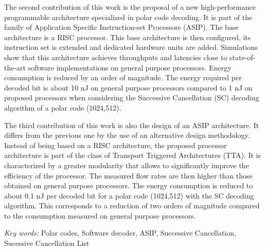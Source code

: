 The second contribution of this work is the proposal of a new high-performance programmable architecture specialized in polar code decoding. It is part of the family of Application Specific Instruction-set Processors (ASIP). The base architecture is a RISC processor. This base architecture is then configured, its instruction set is extended and dedicated hardware units are added. Simulations show that this architecture achieves throughputs and latencies close to state-of-the-art software implementations on general purpose processors. Energy consumption is reduced by an order of magnitude. The energy required per decoded bit is about 10 nJ on general purpose processors compared to 1 nJ on proposed processors when considering the Successive Cancellation (SC) decoding algorithm of a polar code (1024,512).

The third contribution of this work is also the design of an ASIP architecture. It differs from the previous one by the use of an alternative design methodology. Instead of being based on a RISC architecture, the proposed processor architecture is part of the class of Transport Triggered Architectures (TTA). It is characterized by a greater modularity that allows to significantly improve the efficiency of the processor. The measured flow rates are then higher than those obtained on general purpose processors. The energy consumption is reduced to about 0.1 nJ per decoded bit for a polar code (1024,512) with the SC decoding algorithm. This corresponds to a reduction of two orders of magnitude compared to the consumption measured on general purpose processors.

\vskip0.5cm
\emph{Key words:} Polar codes, Software decoder, ASIP, Successive Cancellation, Sucessive Cancellation List
